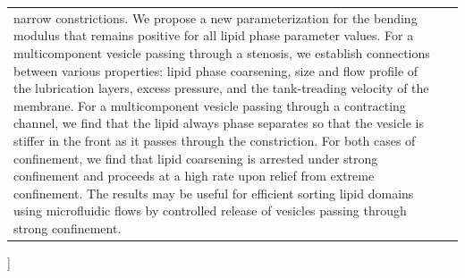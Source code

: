 \documentclass[twoside,twocolumn,9pt]{article}
\begin{document}
\begin{@twocolumnfalse}
\begin{tabular}{m{4.5cm} p{13.5cm} }
{  narrow constrictions. We propose a new parameterization for the
  bending modulus that remains positive for all lipid phase parameter
  values.	
  For a multicomponent vesicle passing through a stenosis, %
  we establish connections between various properties: lipid phase coarsening, size and flow profile of the lubrication layers, %
  excess pressure, and the tank-treading velocity of
  the membrane. For a multicomponent vesicle passing through a
  contracting channel, we find that the lipid always phase separates so
  that the vesicle is stiffer in the front as it passes through the
  constriction. %
  For both cases of confinement, we find that lipid coarsening is
  arrested under strong confinement and proceeds at a high rate upon
  relief from extreme confinement. The results may be useful for
  efficient sorting lipid domains using microfluidic flows by controlled
  release of vesicles passing through strong confinement.} \\
%
\end{tabular}
%
 \end{@twocolumnfalse} \vspace{0.6cm}
]

\renewcommand*\rmdefault{bch}\normalfont\upshape
\rmfamily
\section*{}
\vspace{-1cm}




\end{document}
